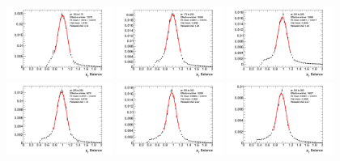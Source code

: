 \begin{figure}[htb!]
    \centering
    \includegraphics[width=0.31\textwidth]{plots/insitu/fits_sherpa_zmm_nominal/Zmmjet_Nominal_Bin2.png}
    \includegraphics[width=0.31\textwidth]{plots/insitu/fits_sherpa_zmm_nominal/Zmmjet_Nominal_Bin3.png}
    \includegraphics[width=0.31\textwidth]{plots/insitu/fits_sherpa_zmm_nominal/Zmmjet_Nominal_Bin4.png}
    \includegraphics[width=0.31\textwidth]{plots/insitu/fits_sherpa_zmm_nominal/Zmmjet_Nominal_Bin5.png}
    \includegraphics[width=0.31\textwidth]{plots/insitu/fits_sherpa_zmm_nominal/Zmmjet_Nominal_Bin6.png}
    \includegraphics[width=0.31\textwidth]{plots/insitu/fits_sherpa_zmm_nominal/Zmmjet_Nominal_Bin7.png}

\end{figure}

